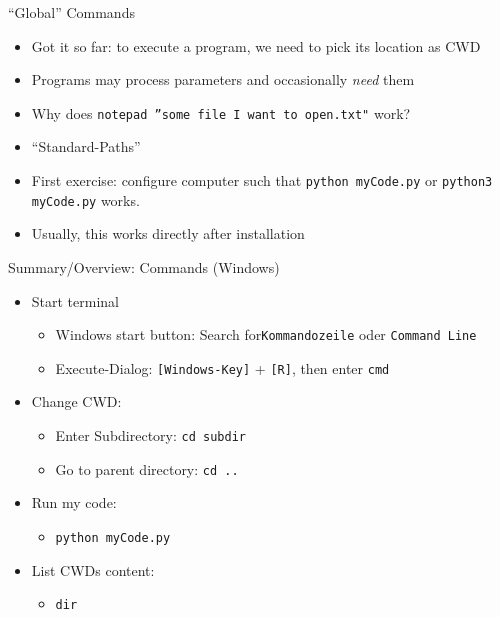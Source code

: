 \begin{frame}{\enquote{Global} Commands}
%
\begin{itemize}
\item Got it so far: to execute a program, we need to pick its location as CWD
\item Programs may process parameters and occasionally \emph{need} them
\item Why does \texttt{notepad ''some file I want to open.txt"} work?
\item[\Thus] \enquote{Standard-Paths}
\item[\Thus] First exercise: configure computer such that \texttt{python myCode.py} or \texttt{python3 myCode.py} works.
\item Usually, this works directly after installation
\end{itemize}
%
\end{frame}


\begin{frame}{Summary/Overview: Commands (Windows)}
\begin{itemize}
\item Start terminal
	\begin{itemize}
	\item Windows start button: Search for\texttt{Kommandozeile} oder \texttt{Command Line}
	\item Execute-Dialog: \texttt{[Windows-Key]} + \texttt{[R]}, then enter \texttt{cmd}
	\end{itemize}
\item Change CWD:
	\begin{itemize}
	\item Enter Subdirectory: \texttt{cd subdir}
	\item Go to parent directory: \texttt{cd ..}
	\end{itemize}
\item Run my code:
	\begin{itemize}
	\item \texttt{python myCode.py}
	\end{itemize}
\item List CWDs content:
	\begin{itemize}
	\item \texttt{dir}
	\end{itemize}
\end{itemize}
\end{frame}

